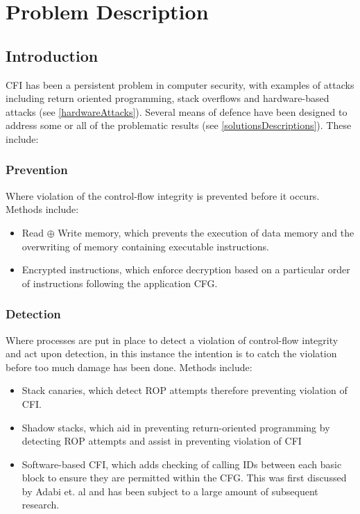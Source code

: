 \section{Problem Description}
\subsection{Introduction}

CFI has been a persistent problem in computer security, with examples of attacks including return oriented programming, stack overflows and hardware-based attacks (see \ref{hardwareAttacks}). Several means of defence have been designed to address some or all of the problematic results (see \ref{solutionsDescriptions}). These include:

\subsubsection{Prevention}
Where violation of the control-flow integrity is prevented before it occurs. Methods include:
\begin{itemize}
	\item Read $\oplus$ Write memory, which prevents the execution of data memory and the overwriting of memory containing executable instructions.
	\item Encrypted instructions, which enforce decryption based on a particular order of instructions following the application CFG.
\end{itemize}

\subsubsection{Detection}
Where processes are put in place to detect a violation of control-flow integrity and act upon detection, in this instance the intention is to catch the violation before too much damage has been done. Methods include:
\begin{itemize}
	\item Stack canaries, which detect ROP attempts therefore preventing violation of CFI.
	\item Shadow stacks, which aid in preventing return-oriented programming by detecting ROP attempts and assist in preventing violation of CFI
	\item Software-based CFI, which adds checking of calling IDs between each basic block to ensure they are permitted within the CFG. This was first discussed by Adabi et. al \cite{Abadi2005} and has been subject to a large amount of subsequent research.
\end{itemize}

